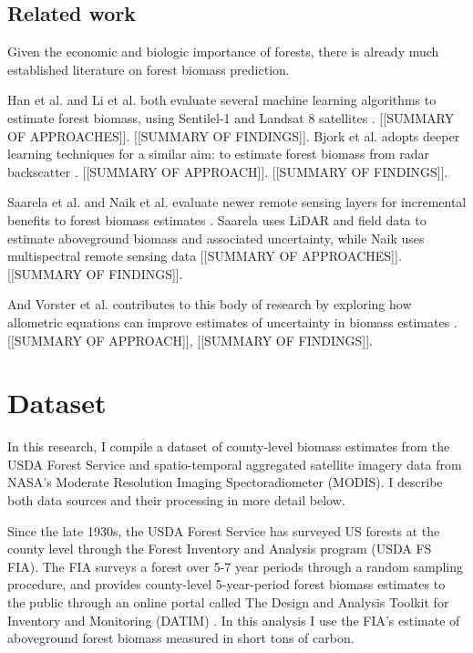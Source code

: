 \documentclass{article}
\begin{document}
\subsection{Related work}

Given the economic and biologic importance of forests, there is already much established literature on forest biomass prediction. 

Han et al. and Li et al. both evaluate several machine learning algorithms to estimate forest biomass, using Sentilel-1 and Landsat 8 satellites \cite{Han_2022, Li_2020}. [[SUMMARY OF APPROACHES]]. [[SUMMARY OF FINDINGS]]. Bjork et al. adopts deeper learning techniques for a similar aim: to estimate forest biomass from radar backscatter \cite{Bjork_2021}. [[SUMMARY OF APPROACH]]. [[SUMMARY OF FINDINGS]].

Saarela et al. and Naik et al. evaluate newer remote sensing layers for incremental benefits to forest biomass estimates \cite{Saarela_2020, Naik_2021}. Saarela uses LiDAR and field data to estimate aboveground biomass and associated uncertainty, while Naik uses multispectral remote sensing data [[SUMMARY OF APPROACHES]]. [[SUMMARY OF FINDINGS]].

And Vorster et al. contributes to this body of research by exploring how allometric equations can improve estimates of uncertainty in biomass estimates \cite{Vorster_2020}. [[SUMMARY OF APPROACH]], [[SUMMARY OF FINDINGS]].


\section{Dataset}

In this research, I compile a dataset of county-level biomass estimates from the USDA Forest Service and spatio-temporal aggregated satellite imagery data from NASA's Moderate Resolution Imaging Spectoradiometer (MODIS). I describe both data sources and their processing in more detail below. 

Since the late 1930s, the USDA Forest Service has surveyed US forests at the county level through the Forest Inventory and Analysis program (USDA FS FIA). The FIA surveys a forest over 5-7 year periods through a random sampling procedure, and provides county-level 5-year-period forest biomass estimates to the public through an online portal called The Design and Analysis Toolkit for Inventory and Monitoring (DATIM) \cite{DATIM}. In this analysis I use the FIA's estimate of aboveground forest biomass measured in short tons of carbon.
\end{document}
